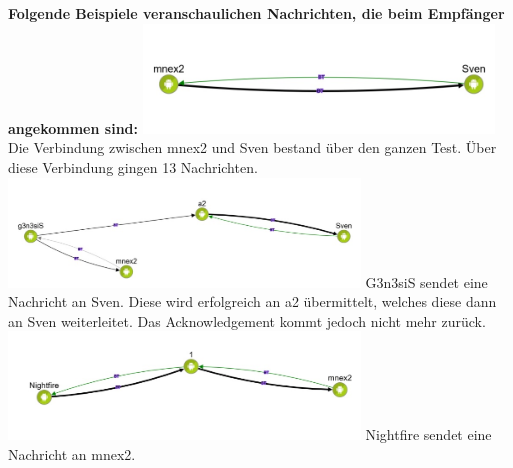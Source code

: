 \textbf{Folgende Beispiele veranschaulichen Nachrichten, die beim
Empfänger angekommen sind:}
\includegraphics[width=0.7\textwidth]{belege/grosstests/Bilder/Grosstest2/Test2Erfolg1.jpg}
Die Verbindung zwischen mnex2 und Sven bestand über den ganzen Test.
Über diese Verbindung gingen 13 Nachrichten.
\includegraphics[width=0.7\textwidth]{belege/grosstests/Bilder/Grosstest2/Test2Erfolg3.jpg}
G3n3siS sendet eine Nachricht an Sven. Diese wird erfolgreich an a2
übermittelt, welches diese dann an Sven weiterleitet. Das
Acknowledgement kommt jedoch nicht mehr zurück.
\includegraphics[width=0.7\textwidth]{belege/grosstests/Bilder/Grosstest2/Test2Erfolg4.jpg}
Nightfire sendet eine Nachricht an mnex2.

